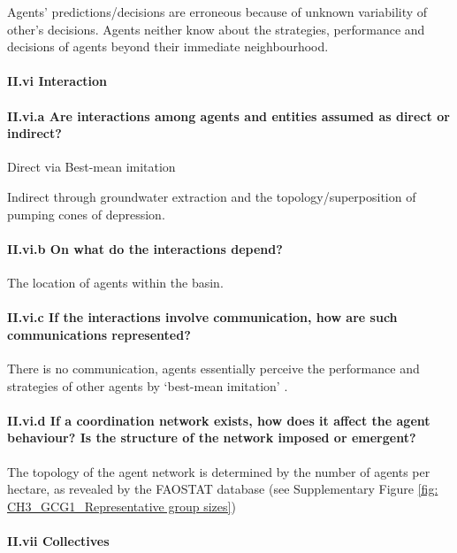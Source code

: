 \documentclass[12pt, a4paper]{article}
\begin{document}
Agents' predictions/decisions are erroneous because of unknown variability of other's decisions. Agents neither know about the strategies, performance and decisions of agents beyond their immediate neighbourhood.

\paragraph{II.vi Interaction}

\paragraph{II.vi.a Are interactions among agents and entities assumed as direct or indirect?}

Direct via Best-mean imitation

Indirect through groundwater extraction and the topology/superposition of pumping cones of depression.

\paragraph{II.vi.b On what do the interactions depend?}

The location of agents within the basin.

\paragraph{II.vi.c If the interactions involve communication, how are such communications represented?}

There is no communication, agents essentially perceive the performance and strategies of other agents by `best-mean imitation' \autocite{Gotts:2009td}.

\paragraph{II.vi.d If a coordination network exists, how does it affect the agent behaviour? Is the structure of the network imposed or emergent?}

The topology of the agent network is determined by the number of agents per hectare, as revealed by the FAOSTAT database (see Supplementary Figure \ref{fig: CH3_GCG1_Representative group sizes})

\paragraph{II.vii Collectives}
\end{document}
